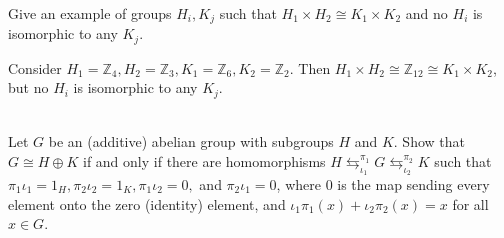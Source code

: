 \documentclass{article}
\def\zz{{\mathbb Z}}
\begin{document}
\begin{problem}[1.8.2] \\ 
    Give an example of groups $H_i, K_j$ such that $H_1 \times H_2 \cong K_1 \times K_2$ and no $H_i$ is isomorphic to any $K_j$.
\end{problem}
Consider $H_1 = \zz_4, H_2 = \zz_3, K_1 = \zz_6, K_2 = \zz_2$. Then $H_1 \times H_2 \cong \zz_{12} \cong K_1 \times K_2$, but no $H_i$ is isomorphic to any $K_j$.


\newpage
\begin{problem}[1.8.3] \\ 
    Let $G$ be an (additive) abelian group with subgroups $H$ and $K$. Show that $G \cong H \oplus K$ if and only if there are homomorphisms $H \mathrel{\mathop{\leftrightarrows}^{{\pi_1}}_{\iota_1}} G \mathrel{\mathop{\leftrightarrows}^{{\pi_2}}_{\iota_2}} K$ such that $\pi_1\iota_1 = 1_H, \pi_2\iota_2 = 1_K, \pi_1\iota_2 = 0,$ and $\pi_2\iota_1 = 0$, where $0$ is the map sending every element onto the zero (identity) element, and $\iota_1\pi_1(x) + \iota_2\pi_2(x) = x$ for all $x \in G$.
\end{problem}
\end{document}
